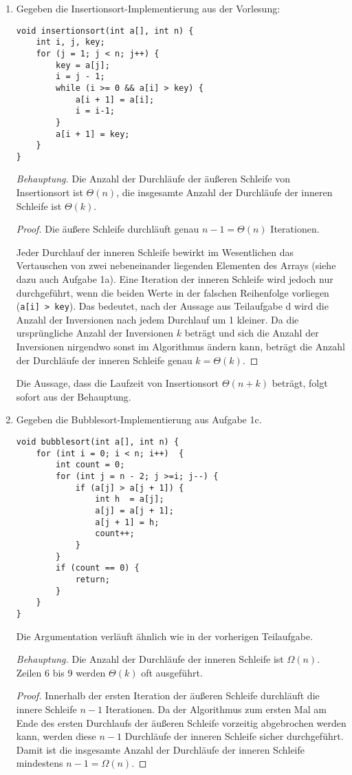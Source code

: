 \documentclass[11pt,a4paper]{article}
\begin{document}
\begin{loesung}
\begin{enumerate}
        \item
        Gegeben die Insertionsort-Implementierung aus der Vorlesung:
        \begin{lstlisting}
void insertionsort(int a[], int n) {
    int i, j, key;
    for (j = 1; j < n; j++) {
        key = a[j];
        i = j - 1; 
        while (i >= 0 && a[i] > key) { 
            a[i + 1] = a[i];
            i = i-1;
        }
        a[i + 1] = key;
    }
} 
        \end{lstlisting}
        \textit{Behauptung.} Die Anzahl der Durchläufe der äußeren Schleife von Insertionsort ist $\Theta(n)$, die insgesamte Anzahl der Durchläufe der inneren Schleife ist $\Theta(k)$.
        \begin{proof}
            Die äußere Schleife durchläuft genau $n - 1 = \Theta(n)$ Iterationen.

            Jeder Durchlauf der inneren Schleife bewirkt im Wesentlichen das Vertauschen von zwei nebeneinander liegenden Elementen des Arrays (siehe dazu auch Aufgabe 1a).
            Eine Iteration der inneren Schleife wird jedoch nur durchgeführt, wenn die beiden Werte in der falschen Reihenfolge vorliegen (\texttt{a[i] > key}).
            Das bedeutet, nach der Aussage aus Teilaufgabe d wird die Anzahl der Inversionen nach jedem Durchlauf um 1 kleiner.
            Da die ursprüngliche Anzahl der Inversionen $k$ beträgt und sich die Anzahl der Inversionen nirgendwo sonst im Algorithmus ändern kann, beträgt die Anzahl der Durchläufe der inneren Schleife genau $k = \Theta(k)$.
        \end{proof}
        Die Aussage, dass die Laufzeit von Insertionsort $\Theta(n + k)$ beträgt, folgt sofort aus der Behauptung.

        \item
        Gegeben die Bubblesort-Implementierung aus Aufgabe 1c.
        \begin{lstlisting}
void bubblesort(int a[], int n) {
    for (int i = 0; i < n; i++)  {
        int count = 0;
        for (int j = n - 2; j >=i; j--) {
            if (a[j] > a[j + 1]) {
                int h  = a[j];
                a[j] = a[j + 1];
                a[j + 1] = h;
                count++;
            }
        }
        if (count == 0) {
            return;
        }
    }
} 
        \end{lstlisting}
        Die Argumentation verläuft ähnlich wie in der vorherigen Teilaufgabe.

        \textit{Behauptung. } Die Anzahl der Durchläufe der inneren Schleife ist $\Omega(n)$. Zeilen 6 bis 9 werden $\Theta(k)$ oft ausgeführt.
        \begin{proof}
            Innerhalb der ersten Iteration der äußeren Schleife durchläuft die innere Schleife $n - 1$ Iterationen.
            Da der Algorithmus zum ersten Mal am Ende des ersten Durchlaufs der äußeren Schleife vorzeitig abgebrochen werden kann, werden diese $n - 1$ Durchläufe der inneren Schleife sicher durchgeführt. Damit ist die insgesamte Anzahl der Durchläufe der inneren Schleife mindestens $n - 1 = \Omega(n)$.


\end{proof}
\end{enumerate}
\end{loesung}
\end{document}
